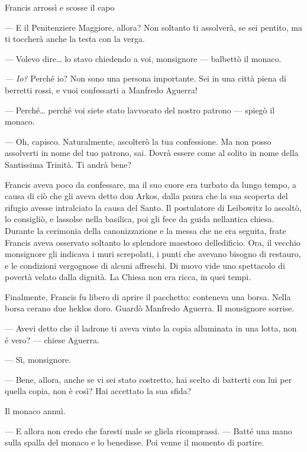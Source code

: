 Francis arrossì e scosse il capo

--- E il Penitenziere Maggiore, allora? Non soltanto ti assolverà, se
sei pentito, ma ti toccherà anche la testa con la verga.

--- Volevo dire\ldots{} lo stavo chiedendo a voi, monsignore ---
balbettò il monaco.

\emph{---} \emph{Io?} Perché io? Non sono una persona importante. Sei in
una città piena di berretti rossi, e vuoi confessarti a Manfredo
Aguerra!

--- Perché\ldots{} perché voi siete stato l\textquotesingle avvocato del
nostro patrono --- spiegò il monaco.

--- Oh, capisco. Naturalmente, ascolterò la tua confessione. Ma non
posso assolverti in nome del tuo patrono, sai. Dovrà essere come al
solito in nome della Santissima Trinità. Ti andrà bene?

Francis aveva poco da confessare, ma il suo cuore era turbato da lungo
tempo, a causa di ciò che gli aveva detto don Arkos, dalla paura che la
sua scoperta del rifugio avesse intralciato la causa del Santo. Il
postulatore di Leibowitz lo ascoltò, lo consigliò, e
l\textquotesingle assolse nella basilica, poi gli fece da guida
nell\textquotesingle antica chiesa. Durante la cerimonia della
canonizzazione e la messa che ne era seguita, frate Francis aveva
osservato soltanto lo splendore maestoso dell\textquotesingle edificio.
Ora, il vecchio monsignore gli indicava i muri screpolati, i punti che
avevano bisogno di restauro, e le condizioni vergognose di alcuni
affreschi. Di nuovo vide uno spettacolo di povertà velato dalla dignità.
La Chiesa non era ricca, in quei tempi.

Finalmente, Francis fu libero di aprire il pacchetto: conteneva una
borsa. Nella borsa c\textquotesingle erano due heklos
d\textquotesingle oro. Guardò Manfredo Aguerra. Il monsignore sorrise.

--- Avevi detto che il ladrone ti aveva vinto la copia alluminata in una
lotta, non é vero? --- chiese Aguerra.

--- Sì, monsignore.

--- Bene, allora, anche se vi sei stato costretto, hai scelto di
batterti con lui per quella copia, non è così? Hai accettato la sua
sfida?

Il monaco annuì.

--- E allora non credo che faresti male se gliela ricomprassi. --- Batté
una mano sulla spalla del monaco e lo benedisse. Poi venne il momento di
partire.


